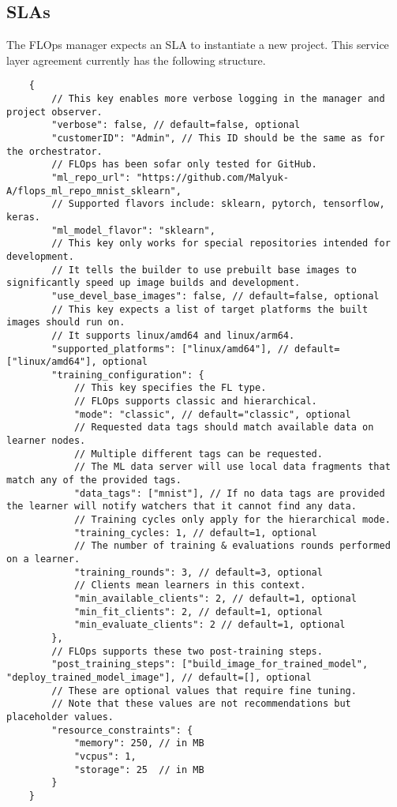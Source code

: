 \subsection{SLAs}
The FLOps manager expects an SLA to instantiate a new project.
This service layer agreement currently has the following structure.

\begin{lstlisting}
    {
        // This key enables more verbose logging in the manager and project observer.
        "verbose": false, // default=false, optional
        "customerID": "Admin", // This ID should be the same as for the orchestrator.
        // FLOps has been sofar only tested for GitHub.
        "ml_repo_url": "https://github.com/Malyuk-A/flops_ml_repo_mnist_sklearn",
        // Supported flavors include: sklearn, pytorch, tensorflow, keras.
        "ml_model_flavor": "sklearn",
        // This key only works for special repositories intended for development.
        // It tells the builder to use prebuilt base images to significantly speed up image builds and development.
        "use_devel_base_images": false, // default=false, optional
        // This key expects a list of target platforms the built images should run on.
        // It supports linux/amd64 and linux/arm64.
        "supported_platforms": ["linux/amd64"], // default=["linux/amd64"], optional
        "training_configuration": {
            // This key specifies the FL type.
            // FLOps supports classic and hierarchical.
            "mode": "classic", // default="classic", optional
            // Requested data tags should match available data on learner nodes.
            // Multiple different tags can be requested.
            // The ML data server will use local data fragments that match any of the provided tags.
            "data_tags": ["mnist"], // If no data tags are provided the learner will notify watchers that it cannot find any data.
            // Training cycles only apply for the hierarchical mode.
            "training_cycles: 1, // default=1, optional
            // The number of training & evaluations rounds performed on a learner.
            "training_rounds": 3, // default=3, optional
            // Clients mean learners in this context.
            "min_available_clients": 2, // default=1, optional
            "min_fit_clients": 2, // default=1, optional
            "min_evaluate_clients": 2 // default=1, optional
        },
        // FLOps supports these two post-training steps.
        "post_training_steps": ["build_image_for_trained_model", "deploy_trained_model_image"], // default=[], optional
        // These are optional values that require fine tuning.
        // Note that these values are not recommendations but placeholder values.
        "resource_constraints": {
            "memory": 250, // in MB
            "vcpus": 1,
            "storage": 25  // in MB
        }
    }
\end{lstlisting}

